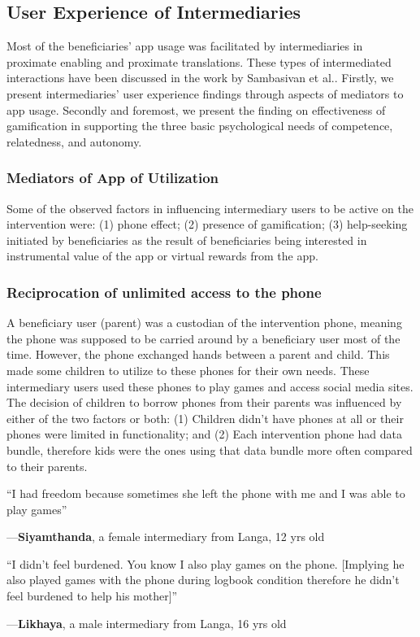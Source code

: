 \documentclass{sig-alternate}
\newenvironment{myquote}
               {\list{}{\rightmargin   \leftmargin
                        \parsep        0in }%
                \item\relax}
               {\endlist}
\newcommand{\userquote}[2]{\begin{samepage}\begin{myquote} 
     \em{\small{#2\begin{flushright}---#1\end{flushright}}}
   \end{myquote}\end{samepage}}
\begin{document}
\subsection{User Experience of Intermediaries}
Most of the beneficiaries' app usage was facilitated by intermediaries  in proximate enabling and proximate translations. These types of intermediated interactions have been discussed in the work by Sambasivan et al.\cite{sambasivan2010}. Firstly, we present intermediaries' user experience findings through aspects of  mediators to app usage. Secondly and foremost, we present the finding on effectiveness of gamification in supporting the three basic psychological needs of competence, relatedness, and autonomy.
\subsubsection{Mediators of App of Utilization}
Some of the observed factors in influencing intermediary users to be active on the intervention were: (1) phone effect; (2) presence of gamification; (3) help-seeking initiated by beneficiaries as the result of beneficiaries being interested in instrumental value of the app or virtual rewards from the app.
\subsubsection*{\textbf{Reciprocation of unlimited access to the phone}}
A beneficiary user (parent) was a custodian of the intervention phone, meaning the phone was supposed to be carried around by a beneficiary user most of the time. However, the phone exchanged hands between a parent and child. This made some children to utilize to these phones for their own needs. These intermediary users used these phones to play games and access social media sites. The decision of children to borrow phones from their parents  was influenced by either of the two factors or both: (1) Children didn't have phones at all or their phones were limited in functionality; and (2) Each intervention phone had data bundle, therefore kids were the ones using that data bundle more often compared to their parents.

\userquote{\textbf{Siyamthanda}, a female intermediary from Langa, 12 yrs old} {``I had freedom because sometimes she left the phone with me and I was able to play games''}

\userquote{\textbf{Likhaya}, a male intermediary from Langa, 16 yrs old} {``I didn't feel burdened. You know I also play games on the phone. [Implying he also played games with the phone during logbook condition therefore he didn't feel burdened to help his mother]''}    
\end{document}
